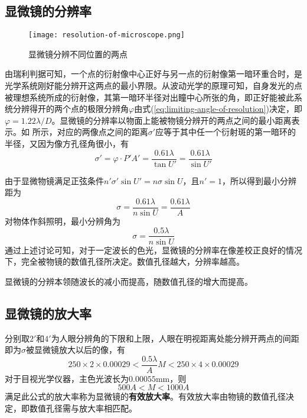 \documentclass[cn,10pt,chinesefont=founder,math=mtpro2,cite=super,toc=onecol,twoside,openany]{elegantbook}
\begin{document}
\subsection{显微镜的分辨率}

\begin{figure}[htbp]
	\centering
	\texttt{[image: resolution-of-microscope.png]}
	\caption{显微镜分辨不同位置的两点}
	\label{fig:resolution-of-microscope}
\end{figure}

由瑞利判据可知，一个点的衍射像中心正好与另一点的衍射像第一暗环重合时，是光学系统刚好能分辨开这两点的最小界限。从波动光学的原理可知，自身发光的点被理想系统所成的衍射像，其第一暗环半径对出瞳中心所张的角，即正好能被此系统分辨得开的两个点的极限分辨角$\varphi$由式(\ref{eq:limiting-angle-of-resolution})决定，即$\varphi=1.22\lambda/D$。显微镜的分辨率以物面上能被物镜分辨开的两点之间的最小距离表示。如 所示，对应的两像点之间的距离$\sigma'$应等于其中任一个衍射斑的第一暗环的半径，又因为像方孔径角很小，有
\begin{equation}
\sigma'=\varphi\cdot P'A'=\frac{0.61\lambda}{\tan U'}=\frac{0.61\lambda}{\sin U'}
\end{equation}

由于显微物镜满足正弦条件$n'\sigma'\sin U'=n\sigma\sin U$，且$n'=1$，所以得到最小分辨距为
\begin{equation}
\sigma=\frac{0.61\lambda}{n\sin U}=\frac{0.61\lambda}{A}
\end{equation}
对物体作斜照明，最小分辨角为
\begin{equation}
\sigma=\frac{0.5\lambda}{n\sin U}
\end{equation}
通过上述讨论可知，对于一定波长的色光，显微镜的分辨率在像差校正良好的情况下，完全被物镜的数值孔径所决定。数值孔径越大，分辨率越高。
\begin{property}
	显微镜的分辨本领随波长的减小而提高，随数值孔径的增大而提高。
\end{property}

\subsection{显微镜的放大率}
分别取$2'$和$4'$为人眼分辨角的下限和上限，人眼在明视距离处能分辨开两点的间距即为$\sigma$被显微镜放大以后的像，有
\begin{equation}
250\times2\times0.00029<\frac{0.5\lambda}{A}M<250\times4\times0.00029
\end{equation}
对于目视光学仪器，主色光波长为$0.00055\mathrm{mm}$，则
\begin{equation}
500A<M<1000A
\end{equation}
满足此公式的放大率称为显微镜的\textbf{有效放大率}。有效放大率由物镜的数值孔径决定，即数值孔径需与放大率相匹配。
\end{document}

